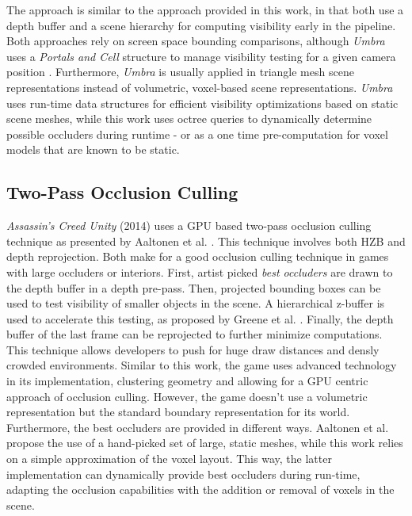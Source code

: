 \noindent 
The approach is similar to the approach provided  in this work, in that both use a depth buffer and a scene hierarchy 
for computing visibility early in the pipeline. Both approaches rely on screen space bounding comparisons, although 
\emph{Umbra} uses a \emph{Portals and Cell} structure to manage visibility testing for a given camera position 
\cite{Medium2018}. Furthermore, \emph{Umbra} is usually applied in triangle mesh scene representations instead 
of volumetric, voxel-based scene representations. \emph{Umbra} uses run-time data structures for efficient visibility 
optimizations based on static scene meshes, while this work uses octree queries to dynamically determine possible 
occluders during runtime - or as a one time pre-computation for voxel models that are known to be static. \\


\subsection*{Two-Pass Occlusion Culling}

\noindent
\emph{Assassin's Creed Unity} (2014) uses a \ac{GPU} based two-pass occlusion culling technique as presented by 
Aaltonen et al. \cite{Aaltonen2015}. This technique involves both \ac{HZB} and depth reprojection. Both make for 
a good occlusion culling technique in games with large occluders or interiors. First, artist picked 
\emph{best occluders} are drawn to the depth buffer in a depth pre-pass. Then, projected bounding boxes can be 
used to test visibility of smaller objects in the scene. A hierarchical z-buffer is used to accelerate this testing,
as proposed by Greene et al. \cite{Greene93,Greene95}. Finally, the depth buffer of the last frame can be 
reprojected to further minimize computations. \\

\noindent
This technique allows developers to push for huge draw distances and densly crowded environments. Similar to this 
work, the game uses advanced technology in its implementation, clustering geometry and allowing for a \ac{GPU} 
centric approach of occlusion culling. However, the game doesn't use a volumetric representation but the standard 
boundary representation for its world. Furthermore, the best occluders are provided in different ways. Aaltonen 
et al. \cite{Aaltonen2015} propose the use of a hand-picked set of large, static meshes, while this work relies 
on a simple approximation of the voxel layout. This way, the latter implementation can dynamically provide best 
occluders during run-time, adapting the occlusion capabilities with the addition or removal of voxels in the scene.

